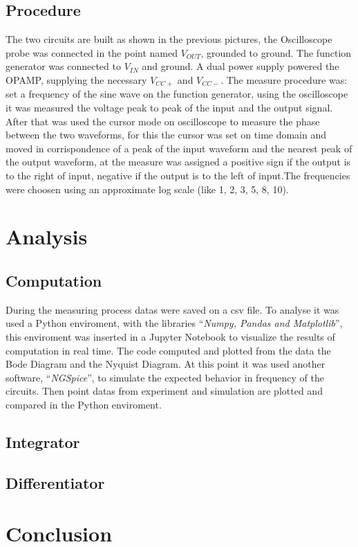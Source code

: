 \documentclass[a4paper,twocolumn]{article}
\begin{document}
    \subsection{Procedure}

The two circuits are built as shown in the previous pictures, the Oscilloscope probe was connected in the point named \(V_{OUT}\), grounded to ground. The function generator was connected to \(V_{IN}\) and ground. A dual power supply powered the OPAMP, supplying the necessary \(V_{CC+}\) and \(V_{CC-}\). The measure procedure was: set a frequency of the sine wave on the function generator, using the oscilloscope it was measured the voltage peak to peak of the input and the output signal. After that was used the cursor mode on oscilloscope to measure the phase between the two waveforms, for this the cursor was set on time domain and moved in corrispondence of a peak of the input waveform and the nearest peak of the output waveform, at the measure was assigned a positive sign if the output is to the right of input, negative if the output is to the left of input.The frequencies were choosen using an approximate log scale (like 1, 2, 3, 5, 8, 10). 

\section{Analysis}

\subsection{Computation}

During the measuring process datas were saved on a csv file. To analyse  it was used a Python enviroment, with the libraries ``\emph{Numpy, Pandas and Matplotlib}'', this enviroment was inserted in a Jupyter Notebook to visualize the results of computation in real time. The code computed and plotted from the data the Bode Diagram and the Nyquist Diagram. At this point it was used another software, ``\emph{NGSpice}'', to simulate the expected behavior in frequency of the circuits. Then point datas from experiment and simulation are plotted and compared in the Python enviroment.

\subsection{Integrator}

\subsection{Differentiator}

\section{Conclusion}
\end{document}
